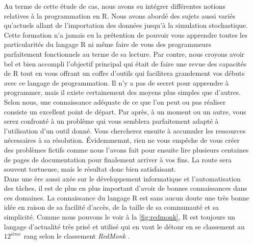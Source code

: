 Au terme de cette étude de cas, nous avons su intégrer différentes notions relatives à la programmation en R. Nous avons abordé des sujets aussi variés qu'actuels allant de l'importation des données jusqu'à la simulation stochastique. \\

Cette formation n'a jamais eu la prétention de pouvoir vous apprendre toutes les particularités du langage R ni même faire de vous des programmeurs parfaitement fonctionnels au terme de sa lecture. Par contre, nous croyons avoir bel et bien accompli l'objectif principal qui était de faire une revue des capacités de R tout en vous offrant un coffre d'outils qui facilitera grandement vos débuts avec ce langage de programmation. Il n'y a pas de secret pour apprendre à programmer, mais il existe certainement des moyens plus simples que d'autres. Selon nous, une connaissance adéquate de ce que l'on peut ou pas réaliser consiste un excellent point de départ. Par après, à un moment ou un autre, vous serez confronté à un problème qui vous semblera parfaitement adapté à l'utilisation d'un outil donné. Vous chercherez ensuite à accumuler les ressources nécessaires à sa résolution. Évidemmemnt, rien ne vous empêche de vous créer des problèmes fictifs comme nous l'avons fait pour ensuite lire plusieurs centaines de pages de documentation pour finalement arriver à vos fins. La route sera souvent tortueuse, mais le résultat donc bien satisfaisant. \\

Dans une ère aussi axée sur le développement informatique et l'automatisation des tâches, il est de plus en plus important d'avoir de bonnes connaissances dans ces domaines. La connaissance du langage R est sans aucun doute une très bonne idée en raison de sa facilité d'accès, de la taille de sa communauté et sa simplicité. Comme nous pouvons le voir à la \autoref{fig:redmonk}, R est toujours un langage d'actualité très prisé et utilisé qui en vaut le détour en se classement au $12^{ième}$ rang selon le classement \emph{RedMonk} \cite{codingGame}. \\


